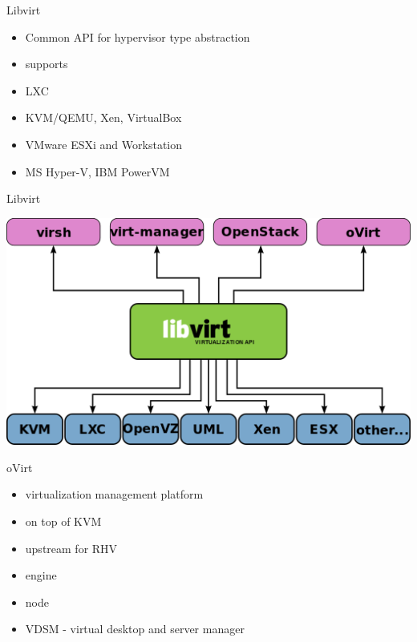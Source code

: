 \documentclass[presentation]{beamer}
\begin{document}
\begin{frame}[label={sec:orgb278c22}]{Libvirt}
\begin{itemize}
\item Common API for hypervisor type abstraction
\item supports
\item LXC
\item KVM/QEMU, Xen, VirtualBox
\item VMware ESXi and Workstation
\item MS Hyper-V, IBM PowerVM
\end{itemize}
\end{frame}
\begin{frame}[label={sec:org14b5d67}]{Libvirt}
\begin{center}
\includegraphics[width=.9\linewidth]{./libvirt.png}
\end{center}
\end{frame}

\begin{frame}[label={sec:orgacb4f67}]{oVirt}
\begin{itemize}
\item virtualization management platform
\item on top of KVM
\item upstream for RHV
\item engine
\item node
\item VDSM - virtual desktop and server manager
\end{itemize}
\end{frame}
\end{document}
